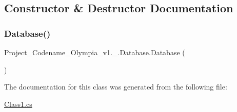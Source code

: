 \subsection{Constructor \& Destructor Documentation}
\mbox{\label{classProject__Codename__Olympia__v1_1_1__0_1_1Database_a21b7504aee323670b290e303530b3da7}} 
\subsubsection{\texorpdfstring{Database()}{Database()}}
{\footnotesize\ttfamily Project\+\_\+\+Codename\+\_\+\+Olympia\+\_\+v1.\+\_.\+Database.\+Database (\begin{DoxyParamCaption}{ }\end{DoxyParamCaption})\hspace{0.3cm}{\ttfamily [inline]}}



The documentation for this class was generated from the following file\+:\begin{DoxyCompactItemize}
\item 
\hyperlink{Class1_8cs}{Class1.\+cs}\end{DoxyCompactItemize}
